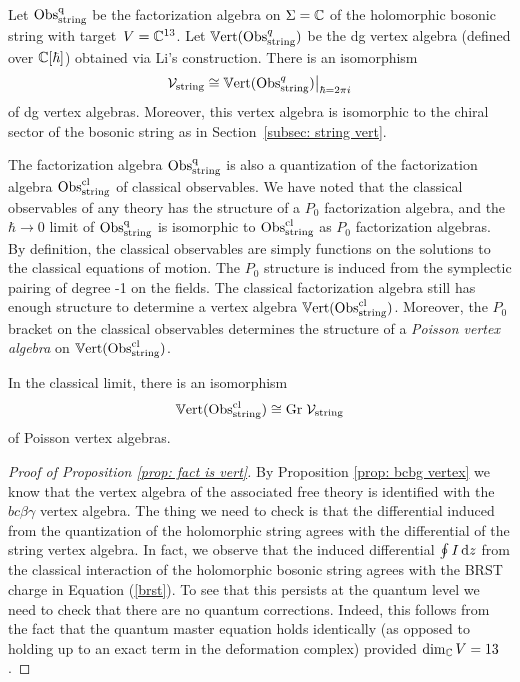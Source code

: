 \begin{prop} 
\label{prop: fact is vert}
Let ${\rm Obs}^{\rm q}_{\rm string}$ be the factorization algebra on $\Sigma = \mathbb C$ of the holomorphic bosonic string with target~$V = \mathbb C^{13}$. 
Let $\mathbb{V}{\rm ert}({\rm Obs}^q_{\rm string})$ be the dg vertex algebra (defined over $\mathbb C[\hbar]$) obtained via Li's construction. 
There is an isomorphism  
\[
\mathcal{V}_{\rm string} \cong \mathbb{V}{\rm ert}({\rm Obs}^q_{\rm string})\big|_{\hbar = 2 \pi i}
\]
of dg vertex algebras.
Moreover, this vertex algebra is isomorphic to the chiral sector of the bosonic string as in Section~\ref{subsec: string vert}.
\end{prop}

The factorization algebra ${\rm Obs}^{\rm q}_{\rm string}$ is also a quantization of the factorization algebra ${\rm Obs}^{{\rm cl}}_{\rm string}$ of classical observables.
We have noted that the classical observables of any theory has the structure of a $P_0$ factorization algebra, and the $\hbar \to 0$ limit of ${\rm Obs}^{\rm q}_{\rm string}$ is isomorphic to ${\rm Obs}^{{\rm cl}}_{\rm string}$ as $P_0$ factorization algebras.
By definition, the classical observables are simply functions on the solutions to the classical equations of motion.
The $P_0$ structure is induced from the symplectic pairing of degree -1 on the fields. 
The classical factorization algebra still has enough structure to determine a vertex algebra $\mathbb{V}{\rm ert}({\rm Obs}^{\rm cl}_{\rm string})$.
Moreover, the $P_0$ bracket on the classical observables determines the structure of a {\em Poisson vertex algebra} on $\mathbb{V}{\rm ert}({\rm Obs}^{{\rm cl}}_{\rm string})$. 

\begin{cor} In the classical limit, there is an isomorphism 
\[
\mathbb{V}{\rm ert}({\rm Obs}^{{\rm cl}}_{\rm string}) \cong {\rm Gr} \; \mathcal{V}_{\rm string}
\]
of Poisson vertex algebras.
\end{cor}

\begin{proof}[Proof of Proposition \ref{prop: fact is vert}] By Proposition \ref{prop: bcbg vertex} we know that the vertex algebra of the associated free theory is identified with the $bc\beta\gamma$ vertex algebra. 
The thing we need to check is that the differential induced from the quantization of the holomorphic string agrees with the differential of the string vertex algebra. 
In fact, we observe that the induced differential $\oint I \,{\rm d} z$ from the classical interaction of the holomorphic bosonic string agrees with the BRST charge in Equation (\ref{brst}). 
To see that this persists at the quantum level we need to check that there are no quantum corrections. 
Indeed, this follows from the fact that the quantum master equation holds identically (as opposed to holding up to an exact term in the deformation complex) provided $\dim_\mathbb C V = 13$. 
\end{proof}

